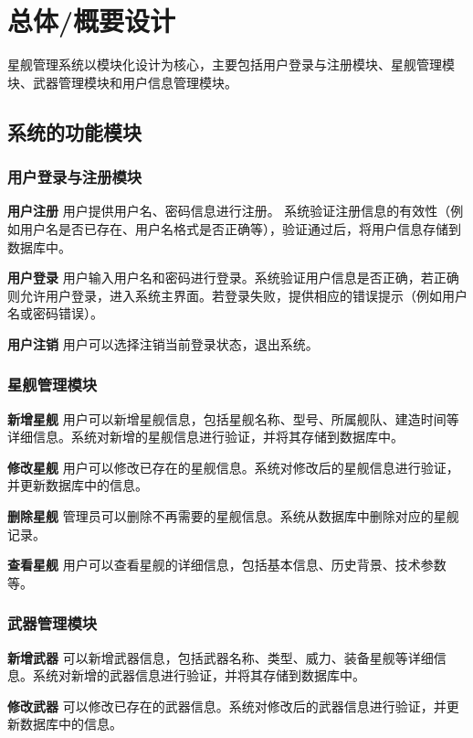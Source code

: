 \documentclass{base}
\begin{document}
\section{总体/概要设计}

星舰管理系统以模块化设计为核心，主要包括用户登录与注册模块、星舰管理模块、武器管理模块和用户信息管理模块。

\subsection{系统的功能模块}

\subsubsection{用户登录与注册模块}
\textbf{用户注册} 用户提供用户名、密码信息进行注册。
系统验证注册信息的有效性（例如用户名是否已存在、用户名格式是否正确等），验证通过后，将用户信息存储到数据库中。

\textbf{用户登录} 用户输入用户名和密码进行登录。系统验证用户信息是否正确，若正确则允许用户登录，进入系统主界面。若登录失败，提供相应的错误提示（例如用户名或密码错误）。

\textbf{用户注销} 用户可以选择注销当前登录状态，退出系统。

\subsubsection{星舰管理模块}

\textbf{新增星舰} 用户可以新增星舰信息，包括星舰名称、型号、所属舰队、建造时间等详细信息。系统对新增的星舰信息进行验证，并将其存储到数据库中。

\textbf{修改星舰} 用户可以修改已存在的星舰信息。系统对修改后的星舰信息进行验证，并更新数据库中的信息。

\textbf{删除星舰} 管理员可以删除不再需要的星舰信息。系统从数据库中删除对应的星舰记录。

\textbf{查看星舰} 用户可以查看星舰的详细信息，包括基本信息、历史背景、技术参数等。

\subsubsection{武器管理模块}

\textbf{新增武器} 可以新增武器信息，包括武器名称、类型、威力、装备星舰等详细信息。系统对新增的武器信息进行验证，并将其存储到数据库中。

\textbf{修改武器} 可以修改已存在的武器信息。系统对修改后的武器信息进行验证，并更新数据库中的信息。
\end{document}
